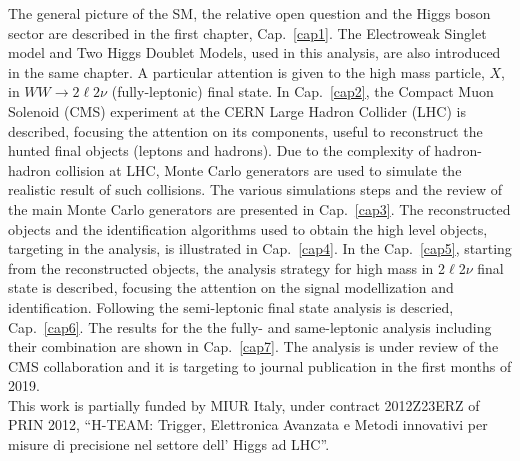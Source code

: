 \documentclass[PhD,binding=0.6cm]{../sapthesis}
\begin{document}
The general picture of the SM,  the relative open question and the Higgs boson sector  are described in the first chapter, Cap.~\ref{cap1}. 
The  Electroweak  Singlet model and Two Higgs Doublet Models, used in this analysis, are also introduced in the same chapter. 
A particular attention is given to the high mass particle, $X$,  in  $WW \to 2\ell 2 \nu$ (fully-leptonic) final state.
In Cap.~\ref{cap2}, the Compact Muon Solenoid (CMS) experiment at the CERN Large Hadron Collider (LHC) is described, focusing the attention on its
components, useful to reconstruct the hunted final objects (leptons and hadrons).
Due to the complexity of  hadron-hadron collision at LHC, Monte Carlo generators are used to simulate the realistic result of such  collisions. 
The various simulations steps and the review of the main Monte Carlo generators are presented in Cap.~\ref{cap3}.
The reconstructed objects and the identification algorithms used to obtain the high level objects, targeting in the analysis, is illustrated in Cap.~\ref{cap4}.
In the Cap.~\ref{cap5}, starting from the reconstructed objects, the analysis strategy for high mass in 2$\ell$2$\nu$ final state  is described, focusing the attention on the signal  modellization and identification.
Following the semi-leptonic final state  analysis is descried, Cap.~\ref{cap6}.
The results for the the fully- and same-leptonic analysis including their combination are shown in Cap.~\ref{cap7}.
The analysis is under review of the CMS collaboration and it is targeting to journal publication in the first months of 2019.\\
\newline
This work is partially funded by MIUR Italy, under contract 2012Z23ERZ of PRIN 2012, ``H-TEAM: Trigger, Elettronica Avanzata e Metodi innovativi per misure di precisione nel settore dell’ Higgs ad LHC''.

\mainmatter


{} 
{} 
{} 
{} 
{} 
{}
{}
{}
{}
{}
{} 
{} 

\appendix
\end{document}

